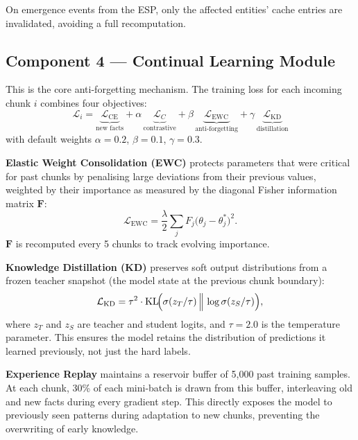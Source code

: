 \documentclass[10pt,a4paper,twocolumn]{article}
\theoremstyle{definition}
\newcommand{\calL}{\mathcal{L}}
\begin{document}
On emergence events from the ESP, only the affected entities' cache
entries are invalidated, avoiding a full recomputation.

\subsection{Component 4 — Continual Learning Module}
\label{sec:cl}

This is the core anti-forgetting mechanism.
The training loss for each incoming chunk $i$ combines four objectives:
\begin{equation}
  \boxed{\calL_i
    = \underbrace{\calL_{\mathrm{CE}}}_{\text{new facts}}
    + \alpha\,\underbrace{\calL_C}_{\text{contrastive}}
    + \beta\,\underbrace{\calL_{\mathrm{EWC}}}_{\text{anti-forgetting}}
    + \gamma\,\underbrace{\calL_{\mathrm{KD}}}_{\text{distillation}}}
  \label{eq:loss}
\end{equation}
with default weights $\alpha = 0.2$, $\beta = 0.1$, $\gamma = 0.3$.

\textbf{Elastic Weight Consolidation (EWC)} \cite{Kirkpatrick2017ewc}
protects parameters that were critical for past chunks by penalising
large deviations from their previous values, weighted by their importance
as measured by the diagonal Fisher information matrix $\mathbf{F}$:
\begin{equation}
  \calL_{\mathrm{EWC}}
    = \frac{\lambda}{2}\sum_j F_j\bigl(\theta_j - \theta^*_j\bigr)^2.
\end{equation}
$\mathbf{F}$ is recomputed every 5 chunks to track evolving importance.

\textbf{Knowledge Distillation (KD)} \cite{Hinton2015distillation}
preserves soft output distributions from a frozen teacher snapshot
(the model state at the previous chunk boundary):
\begin{equation}
  \calL_{\mathrm{KD}} = \tau^2\cdot
    \mathrm{KL}\!\Bigl(\sigma(z_T/\tau)\,\Big\|\,\log\sigma(z_S/\tau)\Bigr),
\end{equation}
where $z_T$ and $z_S$ are teacher and student logits, and $\tau = 2.0$
is the temperature parameter.
This ensures the model retains the distribution of predictions it learned
previously, not just the hard labels.

\textbf{Experience Replay} \cite{Robins1995replay} maintains a reservoir
buffer of 5,000 past training samples.
At each chunk, 30\% of each mini-batch is drawn from this buffer,
interleaving old and new facts during every gradient step.
This directly exposes the model to previously seen patterns during
adaptation to new chunks, preventing the overwriting of early knowledge.
\end{document}
